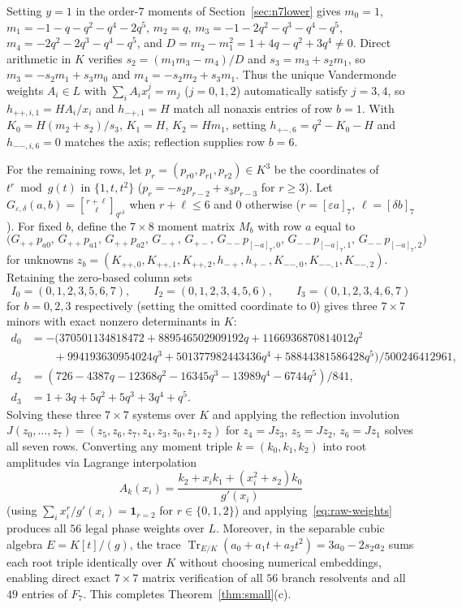 \documentclass[11pt,reqno]{amsart}
\numberwithin{equation}{section}
\theoremstyle{definition}
\theoremstyle{remark}
\newcommand{\Tr}{\operatorname{Tr}}
\newcommand{\gb}[3]{\genfrac{[}{]}{0pt}{}{#1}{#2}_{#3}}
\newcommand{\eps}{\varepsilon}
\begin{document}
Setting $y=1$ in the order-$7$ moments of Section~\ref{sec:n7lower} gives $m_0=1$, $m_1=-1-q-q^2-q^4-2q^5$, $m_2=q$, $m_3=-1-2q^2-q^3-q^4-q^5$, $m_4=-2q^2-2q^3-q^4-q^5$, and $D=m_2-m_1^2=1+4q-q^2+3q^4\ne 0$. Direct arithmetic in $K$ verifies $s_2=(m_1m_3-m_4)/D$ and $s_3=m_3+s_2m_1$, so $m_3=-s_2m_1+s_3m_0$ and $m_4=-s_2m_2+s_3m_1$. Thus the unique Vandermonde weights $A_i\in L$ with $\sum_i A_i x_i^j = m_j$ ($j=0,1,2$) automatically satisfy $j=3,4$, so $h_{++,i,1}=HA_i/x_i$ and $h_{-+,1}=H$ match all nonaxis entries of row $b=1$. With $K_0=H(m_2+s_2)/s_3$, $K_1=H$, $K_2=Hm_1$, setting $h_{+-,6}=q^2-K_0-H$ and $h_{--,i,6}=0$ matches the axis; reflection supplies row $b=6$.

For the remaining rows, let $p_r=(p_{r0},p_{r1},p_{r2})\in K^3$ be the coordinates of $t^r\bmod g(t)$ in $\{1,t,t^2\}$ ($p_r=-s_2p_{r-2}+s_3p_{r-3}$ for $r\ge 3$). Let $G_{\eps,\delta}(a,b)=\gb{r+\ell}{\ell}{q^{\eps\delta}}$ when $r+\ell\le 6$ and $0$ otherwise ($r=[\eps a]_7$, $\ell=[\delta b]_7$). For fixed $b$, define the $7\times 8$ moment matrix $M_b$ with row $a$ equal to
\[
\bigl(G_{++}p_{a0},\, G_{++}p_{a1},\, G_{++}p_{a2},\, G_{-+},\, G_{+-},\, G_{--}p_{[-a]_7,0},\, G_{--}p_{[-a]_7,1},\, G_{--}p_{[-a]_7,2}\bigr)
\]
for unknowns $z_b=(K_{++,0},K_{++,1},K_{++,2},h_{-+},h_{+-},K_{--,0},K_{--,1},K_{--,2})$. Retaining the zero-based column sets
\[
I_0 = (0,1,2,3,5,6,7),\qquad I_2 = (0,1,2,3,4,5,6),\qquad I_3 = (0,1,2,3,4,6,7)
\]
for $b=0,2,3$ respectively (setting the omitted coordinate to $0$) gives three $7\times 7$ minors with exact nonzero determinants in $K$:
\begin{align*}
d_0 &= -\bigl(370501134818472 + 889546502909192q + 1166936870814012q^2 \\
    &\qquad + 994193630954024q^3 + 501377982443436q^4 + 58844381586428q^5\bigr)/500246412961,\\
d_2 &= (726 - 4387q - 12368q^2 - 16345q^3 - 13989q^4 - 6744q^5)/841,\\
d_3 &= 1 + 3q + 5q^2 + 5q^3 + 3q^4 + q^5.
\end{align*}
Solving these three $7\times 7$ systems over $K$ and applying the reflection involution $J(z_0,\ldots,z_7)=(z_5,z_6,z_7,z_4,z_3,z_0,z_1,z_2)$ for $z_4=Jz_3$, $z_5=Jz_2$, $z_6=Jz_1$ solves all seven rows. Converting any moment triple $k=(k_0,k_1,k_2)$ into root amplitudes via Lagrange interpolation
\begin{equation}
\label{eq:lagrange-amp}
A_k(x_i) = \frac{k_2 + x_i k_1 + (x_i^2 + s_2)k_0}{g'(x_i)}
\end{equation}
(using $\sum_i x_i^r/g'(x_i) = \mathbf{1}_{r=2}$ for $r\in\{0,1,2\}$) and applying~\eqref{eq:raw-weights} produces all $56$ legal phase weights over $L$. Moreover, in the separable cubic algebra $E=K[t]/(g)$, the trace $\Tr_{E/K}(a_0+a_1t+a_2t^2)=3a_0-2s_2 a_2$ sums each root triple identically over $K$ without choosing numerical embeddings, enabling direct exact $7\times 7$ matrix verification of all $56$ branch resolvents and all $49$ entries of $F_7$. This completes Theorem~\ref{thm:small}(c).
\end{document}
